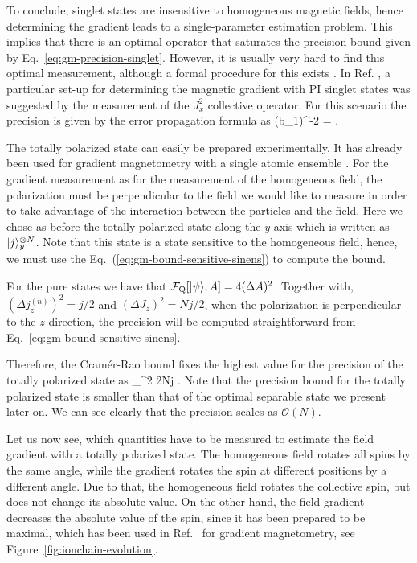 To conclude, singlet states are insensitive to homogeneous magnetic fields, hence determining the gradient leads to a single-parameter estimation problem.
This implies that there is an optimal operator that saturates the precision bound given by Eq.~\eqref{eq:gm-precision-singlet}.
However, it is usually very hard to find this optimal measurement,
although a formal procedure for this exists \cite{Paris2009, Ragy2016}.
In Ref. \cite{Urizar-Lanz2013}, a particular set-up for determining the magnetic gradient with PI singlet states was suggested by the measurement of the $J_x^2$ collective operator.
For this scenario the precision is given by the error propagation formula as
\be
\label{eq:gm- Jx2_acc}
(\Delta b_1)^{-2}
= .
\ee


The totally polarized state can easily be prepared experimentally.
It has already been used for gradient magnetometry with a single atomic ensemble \cite{Koschorreck2011,Vengalattore2007}.
For the gradient measurement as for the measurement of the homogeneous field, the polarization must be perpendicular to the field we would like to measure in order to take advantage of the interaction between the particles and the field.
Here we chose as before the totally polarized state along the $y$-axis which is written as $\vert{j}\rangle_y^{\otimes N}$.
Note that this state is a state sensitive to the homogeneous field, hence, we must use the Eq.~(\ref{eq:gm-bound-sensitive-sinens}) to compute the bound.

For the pure states we have that $\mathcal{F}_{\textnormal{Q}}[{\textstyle \vert{\psi}\rangle, A}] = 4(\Delta A)^2$.
Together with,
$(\Delta j_z^{(n)})^2=j/2$ and $(\Delta J_z)^2=Nj/2$, when the polarization is
perpendicular to the $z$-direction, the precision will be computed straightforward from Eq.~\eqref{eq:gm-bound-sensitive-sinens}.

Therefore, the Cram\'er-Rao bound fixes the highest value for the precision
of the totally polarized state as
\be
  _{}\leqslant \sigma^2 2Nj  .
\ee
Note that the precision bound for the totally polarized state
is smaller than that of the optimal separable state we present later on.
We can see clearly that the precision scales as $\mathcal{O}(N)$.

Let us now see, which quantities have to be measured to estimate the field gradient with a totally polarized state.
The homogeneous field rotates all spins by the same angle, while the gradient rotates the spin at different positions by a different angle.
Due to that, the homogeneous field rotates the collective spin, but does not change its absolute value.
On the other hand, the field gradient decreases the absolute value of the spin, since it has been prepared to be maximal, which has been used in Ref.~\cite{Behbood2013} for gradient magnetometry, see Figure~\ref{fig:ionchain-evolution}.

